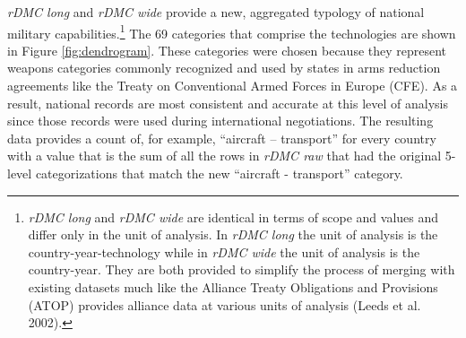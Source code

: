 \documentclass[
]{article}
\begin{document}
\emph{rDMC long} and \emph{rDMC wide} provide a new, aggregated typology of national military capabilities.\footnote{\emph{rDMC long} and \emph{rDMC wide} are identical in terms of scope and values and differ only in the unit of analysis. In \emph{rDMC long} the unit of analysis is the country-year-technology while in \emph{rDMC wide} the unit of analysis is the country-year. They are both provided to simplify the process of merging with existing datasets much like the Alliance Treaty Obligations and Provisions (ATOP) provides alliance data at various units of analysis (Leeds et al. 2002).} The 69 categories that comprise the technologies are shown in Figure \ref{fig:dendrogram}. These categories were chosen because they represent weapons categories commonly recognized and used by states in arms reduction agreements like the Treaty on Conventional Armed Forces in Europe (CFE). As a result, national records are most consistent and accurate at this level of analysis since those records were used during international negotiations. The resulting data provides a count of, for example, ``aircraft -- transport'' for every country with a value that is the sum of all the rows in \emph{rDMC raw} that had the original 5-level categorizations that match the new ``aircraft - transport'' category.
\end{document}
